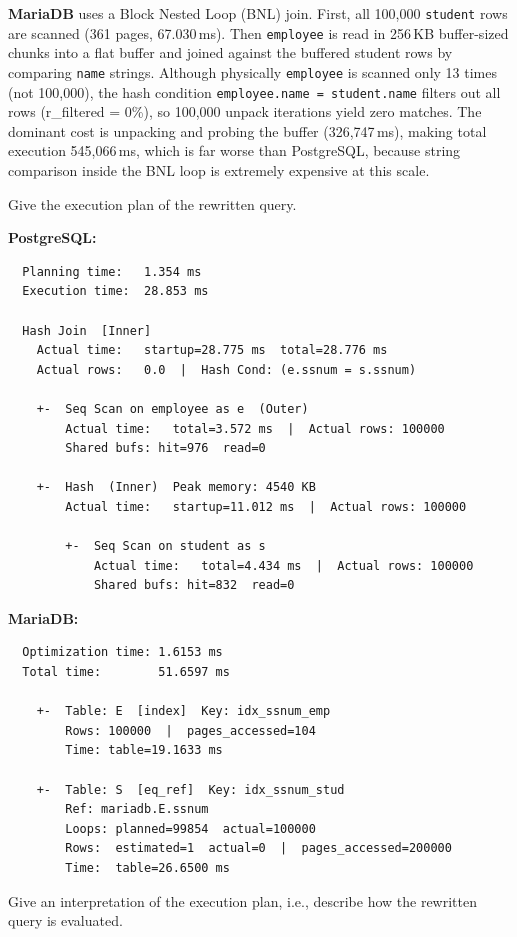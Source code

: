 \documentclass[11pt]{scrartcl}
\begin{document}
\textbf{MariaDB} uses a Block Nested Loop (BNL) join. First, all 100,000 \texttt{student} rows are scanned (361 pages, 67.030\,ms). Then \texttt{employee} is read in 256\,KB buffer-sized chunks into a flat buffer and joined against the buffered student rows by comparing \texttt{name} strings. Although physically \texttt{employee} is scanned only 13 times (not 100,000), the hash condition \texttt{employee.name = student.name} filters out all rows (r\_filtered = 0\%), so 100,000 unpack iterations yield zero matches. The dominant cost is unpacking and probing the buffer (326,747\,ms), making total execution 545,066\,ms, which is far worse than PostgreSQL, because string comparison inside the BNL loop is extremely expensive at this scale.

Give the execution plan of the rewritten query.

\textbf{PostgreSQL:}

{\small
\parskip0pt\begin{verbatim}
  Planning time:   1.354 ms
  Execution time:  28.853 ms

  Hash Join  [Inner]
    Actual time:   startup=28.775 ms  total=28.776 ms
    Actual rows:   0.0  |  Hash Cond: (e.ssnum = s.ssnum)

    +-  Seq Scan on employee as e  (Outer)
        Actual time:   total=3.572 ms  |  Actual rows: 100000
        Shared bufs: hit=976  read=0

    +-  Hash  (Inner)  Peak memory: 4540 KB
        Actual time:   startup=11.012 ms  |  Actual rows: 100000

        +-  Seq Scan on student as s
            Actual time:   total=4.434 ms  |  Actual rows: 100000
            Shared bufs: hit=832  read=0
\end{verbatim}}

\textbf{MariaDB:}

{\small
\parskip0pt\begin{verbatim}
  Optimization time: 1.6153 ms
  Total time:        51.6597 ms

    +-  Table: E  [index]  Key: idx_ssnum_emp
        Rows: 100000  |  pages_accessed=104
        Time: table=19.1633 ms

    +-  Table: S  [eq_ref]  Key: idx_ssnum_stud
        Ref: mariadb.E.ssnum
        Loops: planned=99854  actual=100000
        Rows:  estimated=1  actual=0  |  pages_accessed=200000
        Time:  table=26.6500 ms
\end{verbatim}}

Give an interpretation of the execution plan, i.e., describe how the rewritten query is evaluated.
\end{document}
